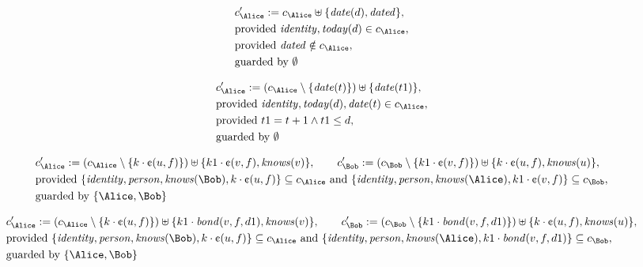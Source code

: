 \begin{align*}
&
c'_
{
\Alice
}
 := 
c_
{
\Alice
}
 \uplus 
\{
\mathit{
date
}
(
d
)
,
\mathit{
dated
}
\}
,\\
&
\text{provided } 
\mathit{
identity
}
,
\mathit{
today
}
(
d
)
 \in c_
{
\Alice
}
,\\
&
\text{provided } 
\mathit{
dated
}
 \notin c_
{
\Alice
}
,\\
&
\text{guarded by } \emptyset
\end{align*}

\begin{align*}
&
c'_
{
\Alice
}
 := 
(c_
{
\Alice
}
 \setminus 
\{
\mathit{
date
}
(
t
)
\}
) \uplus 
\{
\mathit{
date
}
(
t1
)
\}
,\\
&
\text{provided } 
\mathit{
identity
}
,
\mathit{
today
}
(
d
)
,
\mathit{
date
}
(
t
)
 \in c_
{
\Alice
}
,\\
&
\text{provided } 
t1
=
t
+ 1
\land
t1
\le
d
,\\
&
\text{guarded by } \emptyset
\end{align*}

\begin{align*}
&
c'_
{
\Alice
}
 := 
(c_
{
\Alice
}
 \setminus 
\{
k
\cdot
\text{\textcent}
(
u
,
f
)
\}
) \uplus 
\{
k1
\cdot
\text{\textcent}
(
v
,
f
)
,
\mathit{
knows
}
(
v
)
\}
, \qquad 
c'_
{
\Bob
}
 := 
(c_
{
\Bob
}
 \setminus 
\{
k1
\cdot
\text{\textcent}
(
v
,
f
)
\}
) \uplus 
\{
k
\cdot
\text{\textcent}
(
u
,
f
)
,
\mathit{
knows
}
(
u
)
\}
,\\
&
\text{provided } 
\{
\mathit{
identity
}
,
\mathit{
person
}
,
\mathit{
knows
}
(
\Bob
)
,
k
\cdot
\text{\textcent}
(
u
,
f
)
\}
 \subseteq c_
{
\Alice
}
 \text{ and } 
\{
\mathit{
identity
}
,
\mathit{
person
}
,
\mathit{
knows
}
(
\Alice
)
,
k1
\cdot
\text{\textcent}
(
v
,
f
)
\}
 \subseteq c_
{
\Bob
}
,\\
&
\text{guarded by } \{
\Alice
,
\Bob
\}
\end{align*}

\begin{align*}
&
c'_
{
\Alice
}
 := 
(c_
{
\Alice
}
 \setminus 
\{
k
\cdot
\text{\textcent}
(
u
,
f
)
\}
) \uplus 
\{
k1
\cdot
\mathit{
bond
}
(
v
,
f
,
d1
)
,
\mathit{
knows
}
(
v
)
\}
, \qquad 
c'_
{
\Bob
}
 := 
(c_
{
\Bob
}
 \setminus 
\{
k1
\cdot
\mathit{
bond
}
(
v
,
f
,
d1
)
\}
) \uplus 
\{
k
\cdot
\text{\textcent}
(
u
,
f
)
,
\mathit{
knows
}
(
u
)
\}
,\\
&
\text{provided } 
\{
\mathit{
identity
}
,
\mathit{
person
}
,
\mathit{
knows
}
(
\Bob
)
,
k
\cdot
\text{\textcent}
(
u
,
f
)
\}
 \subseteq c_
{
\Alice
}
 \text{ and } 
\{
\mathit{
identity
}
,
\mathit{
person
}
,
\mathit{
knows
}
(
\Alice
)
,
k1
\cdot
\mathit{
bond
}
(
v
,
f
,
d1
)
\}
 \subseteq c_
{
\Bob
}
,\\
&
\text{guarded by } \{
\Alice
,
\Bob
\}
\end{align*}
